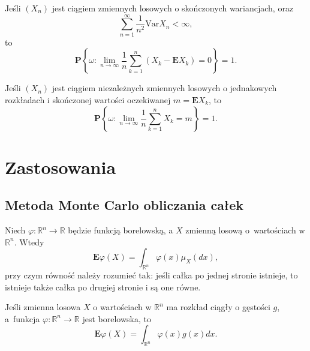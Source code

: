 \begin{tw}
	Jeśli $(X_n)$ jest ciągiem zmiennych losowych o skończonych wariancjach, oraz 
	\[
		\sum_{n=1}^{\infty} \frac{1}{n^2} \text{Var}X_n < \infty,
	\]
	to
	\[
		\textbf{P} \left\{ \omega : \lim_{n \to \infty}  \frac{1}{n} \sum_{k=1}^{n}(X_k - \textbf{E}X_k) = 0  \right\} = 1.
	\]	
\end{tw}

\begin{tw}
	Jeśli $(X_n)$ jest ciągiem niezależnych zmiennych losowych o jednakowych rozkładach i skończonej wartości oczekiwanej $m = \textbf{E}X_k$, to 
	\[
	\textbf{P} \left\{ \omega : \lim_{n \to \infty}  \frac{1}{n} \sum_{k=1}^{n}X_k = m  \right\} = 1.
	\]	
\end{tw}

\section{Zastosowania}
	\subsection{Metoda Monte Carlo obliczania całek}
		\begin{tw}
			Niech $\varphi: \mathbb{R}^n \to \mathbb{R}$ będzie funkcją borelowską, a $X$ zmienną losową o~wartościach w $\mathbb{R}^n$. Wtedy
			\begin{equation*}
				\textbf{E}\varphi(X) = \int_{\mathbb{R}^n} \varphi(x) \mu_X(dx),
			\end{equation*}
			przy czym równość należy rozumieć tak: jeśli całka po jednej stronie istnieje, to istnieje także całka po drugiej stronie i są one równe.
		\end{tw}
		\begin{wnsk}\label{expected-falue-of-real-function}
			Jeśli zmienna losowa $X$ o wartościach w $\mathbb{R}^n$ ma rozkład ciągły o gęstości $g$, a~funkcja  $\varphi: \mathbb{R}^n \to \mathbb{R}$ jest borelowska, to
			\begin{equation*}
				\textbf{E}\varphi(X) = \int_{\mathbb{R}^n} \varphi(x) g(x)dx.
			\end{equation*}
		\end{wnsk}
		
